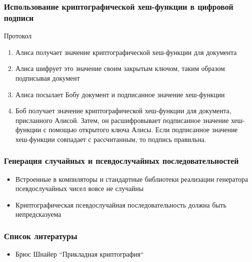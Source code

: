 \documentclass{beamer}
\begin{document}
\begin{frame}
  \frametitle{Использование криптографической хеш-функции в цифровой подписи}

  \begin{block} {Протокол}
    \begin{enumerate}
      \item{Алиса получает значение криптографической хеш-функции для документа}
      \item{Алиса шифрует это значение своим закрытым ключом, таким образом подписывая документ}
      \item{Алиса посылает Бобу документ и подписанное значение хеш-функции}
      \item{Боб получает значение криптографической хеш-функции для документа, присланного Алисой. Затем,
            он расшифровывает подписанное значение хеш-функции с помощью открытого ключа Алисы. Если подписанное
            значение хеш-функции совпадает с рассчитанным, то подпись правильна.}
    \end{enumerate}
  \end{block}
\end{frame}


\begin{frame}
  \frametitle{Генерация случайных и псевдослучайных последовательностей}

  \begin{itemize}
    \item{Встроенные в компиляторы и стандартные библиотеки реализации генератора псевдослучайных чисел вовсе не случайны}
    \item{Криптографическая псевдослучайная последовательность должна быть непредсказуема}
  \end{itemize}
\end{frame}


\begin{frame}
  \frametitle{Список литературы}

  \begin{itemize}
    \item{Брюс Шнайер ``Прикладная криптография``}
  \end{itemize}
\end{frame}
\end{document}
